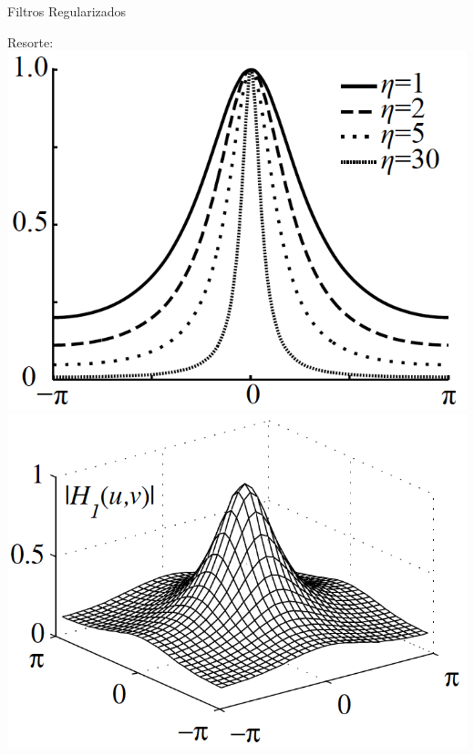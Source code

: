 \documentclass[]{beamer}
\begin{document}
\begin{frame}{Filtros Regularizados}
\begin{center}

Resorte:\\
\includegraphics[scale=0.45]{Images/FrecuenciaResorte.png}
\includegraphics[scale=0.45]{Images/FrecuenciaResorte3D.png}

\end{center}
\end{frame}
\end{document}

